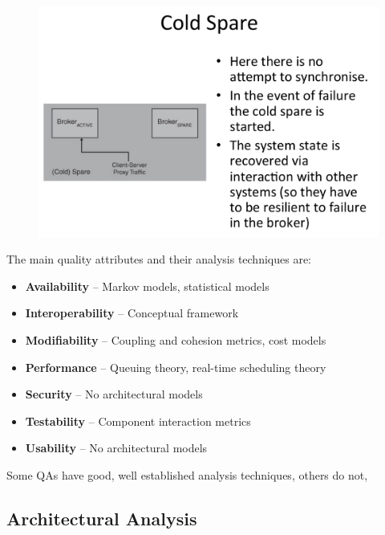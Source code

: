 \documentclass[a4paper]{article}
\begin{document}
\begin{figure}[H]
  \includegraphics[scale=0.4]{images/cold-spare.png}
\end{figure}


The main quality attributes and their analysis techniques are:
\begin{itemize}

\item \textbf{Availability} – Markov models, statistical models \newline

\item \textbf{Interoperability} – Conceptual framework 

\item \textbf{Modifiability} – Coupling and cohesion metrics, cost models

\item \textbf{Performance} – Queuing theory, real-time scheduling theory

\item \textbf{Security} – No architectural models

\item \textbf{Testability} – Component interaction metrics

\item \textbf{Usability} – No architectural models
\end{itemize}

Some QAs have good, well established analysis techniques, others do not,



\subsection{Architectural Analysis}
\end{document}
